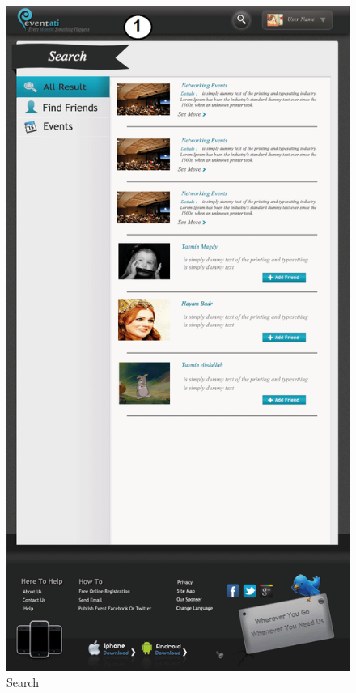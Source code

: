 \documentclass[12pt,a4paper,class,twoside,openany]{report}
\begin{document}
{\begin{figure}
\begin{center}
\includegraphics[height=8 in]{8-6}
\caption{Search}
\label{fg:8-6}
\end{center}
\end{figure}
}
\end{document}
